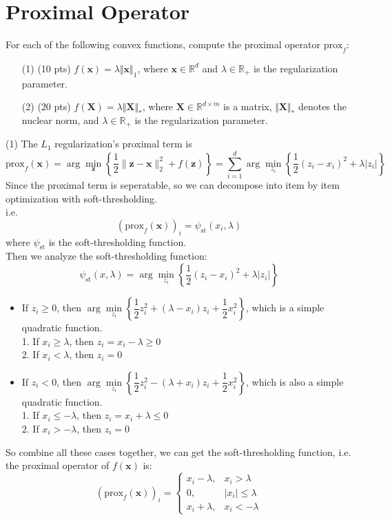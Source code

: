 \section{Proximal Operator}
    For each of the following convex functions, compute the proximal operator $\text{prox}_{f}$:
\begin{itemize}
    \item[(1)] {\color{red} (10 pts)}  $f({\mathbf{x}}) = \lambda\Vert {\mathbf{x} }\Vert_{1}$, where ${\mathbf{x}}\in\mathbb{R}^{d}$ and $\lambda \in \mathbb{R}_{+}$ is the regularization parameter.

    \item[(2)] {\color{red} (20 pts)} $f(\mathbf{X}) = \lambda \Vert \mathbf{X}\Vert_{*}$, where $\mathbf{X}\in \mathbb{R}^{d\times m}$ is a matrix, $\Vert \mathbf{X}\Vert_{*}$ denotes the nuclear norm, and $\lambda\in \mathbb{R}_{+}$ is the regularization parameter.
\end{itemize}

\solution{}
(1) The $L_1$ regularization's proximal term is
$$\text{prox}_{f}(\mathbf{x})=\arg\min\limits_{\mathbf{z}}\left\{\dfrac{1}{2}\|\mathbf{z}-\mathbf{x}\|_2^2+f(\mathbf{z})\right\}=\sum\limits_{i=1}^d\arg\min\limits_{z_i}\left\{\dfrac{1}{2}(z_i-x_i)^2+\lambda|z_i|\right\}$$
Since the proximal term is seperatable, so we can decompose into item by item optimization with soft-thresholding.\\
i.e.
$$(\text{prox}_{f}(\mathbf{x}))_i = \psi_{\text{st}}(x_i,\lambda)$$
where $\psi_{\text{st}}$ is the soft-thresholding function.\\
Then we analyze the soft-thresholding function:\\
$$\psi_{\text{st}}(x,\lambda) = \arg\min\limits_{z_i}\left\{\dfrac{1}{2}(z_i-x_i)^2+\lambda|z_i|\right\}$$
\begin{itemize}
    \item If $z_i\geq 0$, then $\arg\min\limits_{z_i}\left\{\dfrac{1}{2}z_i^2+(\lambda-x_i)z_i+\dfrac{1}{2}x_i^2\right\}$, which is a simple quadratic function. \\
    1. If $x_i \geq \lambda$, then $z_i = x_i-\lambda\geq 0$ \\
    2. If $x_i < \lambda$, then $z_i = 0$ \\
    \item If $z_i < 0$, then $\arg\min\limits_{z_i}\left\{\dfrac{1}{2}z_i^2-(\lambda+x_i)z_i+\dfrac{1}{2}x_i^2\right\}$, which is also a simple quadratic function. \\
    1. If $x_i \leq -\lambda$, then $z_i = x_i+\lambda\leq 0$ \\
    2. If $x_i > -\lambda$, then $z_i = 0$
\end{itemize}
So combine all these cases together, we can get the soft-thresholding function, i.e. the proximal operator of $f(\mathbf{x})$ is:
$$(\text{prox}_{f}(\mathbf{x}))_i = \begin{cases}
x_i-\lambda, & x_i > \lambda \\
0, & |x_i| \leq \lambda \\
x_i+\lambda, & x_i < -\lambda
\end{cases}$$\\

